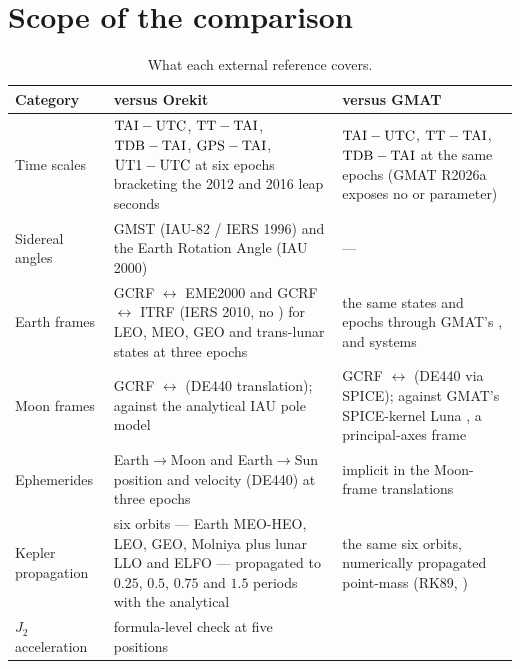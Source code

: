 \section{Scope of the comparison}
\label{sec:xval-scope}

\begin{table}[htbp]
  \centering
  \caption{What each external reference covers.}
  \label{tab:xval-scope}
  \small
  \begin{tabularx}{\textwidth}{@{}l L L@{}}
    \toprule
    Category & versus Orekit & versus GMAT \\
    \midrule
    Time scales &
      $\mathrm{TAI}-\mathrm{UTC}$, $\mathrm{TT}-\mathrm{TAI}$, $\mathrm{TDB}-\mathrm{TAI}$, $\mathrm{GPS}-\mathrm{TAI}$, $\mathrm{UT1}-\mathrm{UTC}$ at six
      epochs bracketing the 2012 and 2016 leap seconds &
      $\mathrm{TAI}-\mathrm{UTC}$, $\mathrm{TT}-\mathrm{TAI}$, $\mathrm{TDB}-\mathrm{TAI}$ at the same epochs (GMAT R2026a
      exposes no  or  parameter) \\
    Sidereal angles &
      GMST (IAU-82 / IERS 1996) and the Earth Rotation Angle (IAU 2000) &
      --- \\
    Earth frames &
      GCRF $\leftrightarrow$ EME2000 and GCRF $\leftrightarrow$ ITRF (IERS
      2010, no ) for LEO, MEO, GEO and trans-lunar states at
      three epochs &
      the same states and epochs through GMAT's ,
       and  systems \\
    Moon frames &
      GCRF $\leftrightarrow$  (DE440 translation);
       against the analytical IAU pole model &
      GCRF $\leftrightarrow$  (DE440 via SPICE); 
      against GMAT's SPICE-kernel Luna , a principal-axes
      frame \\
    Ephemerides &
      Earth$\to$Moon and Earth$\to$Sun position and velocity (DE440) at three
      epochs &
      implicit in the Moon-frame translations \\
    Kepler propagation &
      six orbits --- Earth MEO-HEO, LEO, GEO, Molniya plus lunar LLO and ELFO
      --- propagated to $0.25$, $0.5$, $0.75$ and $1.5$ periods with the
      analytical  &
      the same six orbits, numerically propagated point-mass (RK89,
      ) \\
    $J_2$ acceleration &
      formula-level check at five positions

\end{tabularx}
\end{table}

